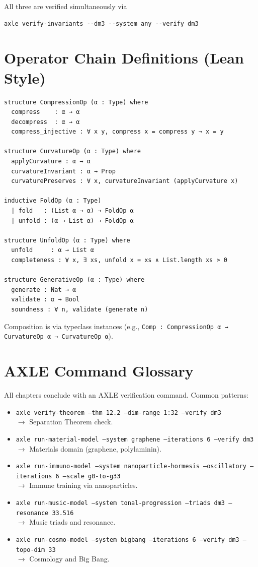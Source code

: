 All three are verified simultaneously via
\begin{verbatim}
axle verify-invariants --dm3 --system any --verify dm3
\end{verbatim}

\chapter{Operator Chain Definitions (Lean Style)}

\begin{lstlisting}[language=Lean,caption={Core Operator Types in AXLE}]
structure CompressionOp (α : Type) where
  compress    : α → α
  decompress  : α → α
  compress_injective : ∀ x y, compress x = compress y → x = y

structure CurvatureOp (α : Type) where
  applyCurvature : α → α
  curvatureInvariant : α → Prop
  curvaturePreserves : ∀ x, curvatureInvariant (applyCurvature x)

inductive FoldOp (α : Type)
  | fold   : (List α → α) → FoldOp α
  | unfold : (α → List α) → FoldOp α

structure UnfoldOp (α : Type) where
  unfold     : α → List α
  completeness : ∀ x, ∃ xs, unfold x = xs ∧ List.length xs > 0

structure GenerativeOp (α : Type) where
  generate : Nat → α
  validate : α → Bool
  soundness : ∀ n, validate (generate n)
\end{lstlisting}

Composition is via typeclass instances (e.g., \texttt{Comp : CompressionOp α → CurvatureOp α → CurvatureOp α}).

\chapter{AXLE Command Glossary}

All chapters conclude with an AXLE verification command. Common patterns:

\begin{itemize}
\item \texttt{axle verify-theorem --thm 12.2 --dim-range 1:32 --verify dm3}\\
  $\to$ Separation Theorem check.
\item \texttt{axle run-material-model --system graphene --iterations 6 --verify dm3}\\
  $\to$ Materials domain (graphene, polylaminin).
\item \texttt{axle run-immuno-model --system nanoparticle-hormesis --oscillatory --iterations 6 --scale g0-to-g33}\\
  $\to$ Immune training via nanoparticles.
\item \texttt{axle run-music-model --system tonal-progression --triads dm3 --resonance 33.516}\\
  $\to$ Music triads and resonance.
\item \texttt{axle run-cosmo-model --system bigbang --iterations 6 --verify dm3 --topo-dim 33}\\
  $\to$ Cosmology and Big Bang.
\end{itemize}

